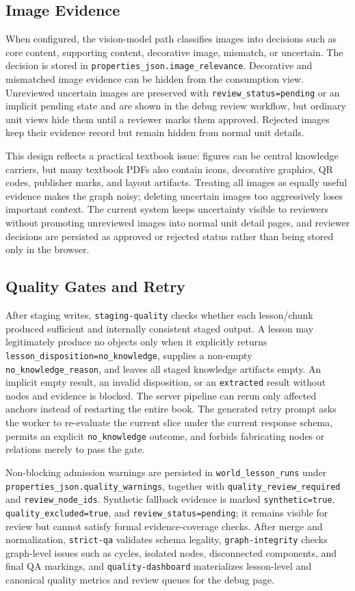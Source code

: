 \documentclass[11pt,letterpaper]{article}
\newcommand{\code}[1]{\nolinkurl{#1}}
\begin{document}
\subsection{Image Evidence}

When configured, the vision-model path classifies images into decisions such as core content, supporting content, decorative image, mismatch, or uncertain. The decision is stored in \code{properties_json.image_relevance}. Decorative and mismatched image evidence can be hidden from the consumption view. Unreviewed uncertain images are preserved with \code{review_status=pending} or an implicit pending state and are shown in the debug review workflow, but ordinary unit views hide them until a reviewer marks them approved. Rejected images keep their evidence record but remain hidden from normal unit details.

This design reflects a practical textbook issue: figures can be central knowledge carriers, but many textbook PDFs also contain icons, decorative graphics, QR codes, publisher marks, and layout artifacts. Treating all images as equally useful evidence makes the graph noisy; deleting uncertain images too aggressively loses important context. The current system keeps uncertainty visible to reviewers without promoting unreviewed images into normal unit detail pages, and reviewer decisions are persisted as approved or rejected status rather than being stored only in the browser.

\subsection{Quality Gates and Retry}

After staging writes, \code{staging-quality} checks whether each lesson/chunk produced sufficient and internally consistent staged output. A lesson may legitimately produce no objects only when it explicitly returns \code{lesson_disposition=no_knowledge}, supplies a non-empty \code{no_knowledge_reason}, and leaves all staged knowledge artifacts empty. An implicit empty result, an invalid disposition, or an \code{extracted} result without nodes and evidence is blocked. The server pipeline can rerun only affected anchors instead of restarting the entire book. The generated retry prompt asks the worker to re-evaluate the current slice under the current response schema, permits an explicit \code{no_knowledge} outcome, and forbids fabricating nodes or relations merely to pass the gate.

Non-blocking admission warnings are persisted in \code{world_lesson_runs} under \code{properties_json.quality_warnings}, together with \code{quality_review_required} and \code{review_node_ids}. Synthetic fallback evidence is marked \code{synthetic=true}, \code{quality_excluded=true}, and \code{review_status=pending}; it remains visible for review but cannot satisfy formal evidence-coverage checks. After merge and normalization, \code{strict-qa} validates schema legality, \code{graph-integrity} checks graph-level issues such as cycles, isolated nodes, disconnected components, and final QA markings, and \code{quality-dashboard} materializes lesson-level and canonical quality metrics and review queues for the debug page.
\end{document}
